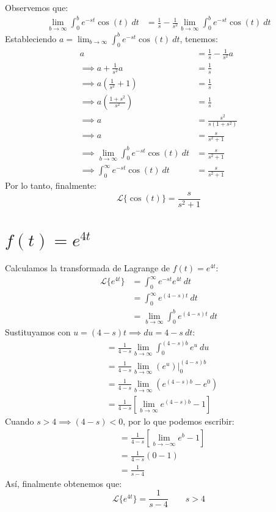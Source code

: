 \documentclass[12pt, a4paper]{article}
\begin{document}
Observemos que:
\begin{align*}
	\lim_{b \to \infty} \int_{0}^{b} e^{-st} \cos (t) \ dt &= \frac{1}{s} - \frac{1}{s^{2}}\lim_{b \to \infty} \int_{0}^{b} e^{-st} \cos (t) \ dt
\end{align*}
Estableciendo \(a = \lim_{b \to \infty} \int_{0}^{b} e^{-st} \cos (t) \ dt\), tenemos:
\begin{align*}
	a &= \frac{1}{s} - \frac{1}{s ^{2}} a \\
	\implies a + \frac{1}{s ^{2}} a &= \frac{1}{s} \\
	\implies a \left(\frac{1}{s ^{2}} + 1 \right) &= \frac{1}{s} \\
	\implies a \left( \frac{1+s ^{2}}{s ^{2}} \right) &= \frac{1}{s} \\
	\implies a &= \frac{s ^{2}}{s(1+s ^{2})} \\
	\implies a &= \frac{s}{s ^{2} + 1} \\
	\implies \lim_{b \to \infty} \int_{0}^{b} e^{-st} \cos (t) \ dt &= \frac{s}{s ^{2} + 1} \\
	\implies \int_{0}^{\infty} e^{-st} \cos (t) \ dt &= \frac{s}{s ^{2} + 1}
\end{align*}
Por lo tanto, finalmente:
\[
	\mathcal{L}\{\cos (t)\} = \frac{s}{s ^{2} + 1}
\]


\setcounter{section}{10}
\section{\texorpdfstring{\(f(t)=e^{4t}\)}{f (t) = e (4t) }}

Calculamos la transformada de Lagrange de \(f(t) = e^{4t}\):
\begin{align*}
	\mathcal{L}\{e^{4t}\} &= \int_{0}^{\infty} e^{-st} e^{4t}\ dt \\
	&= \int_{0}^{\infty} e^{(4-s)t} \ dt \\
	&= \lim_{b \to \infty} \int_{0}^{b} e^{(4-s)t} \ dt
\end{align*}
Sustituyamos con \(u = (4-s) t \implies du = 4-s\ dt\):
\begin{align*}
	&= \frac{1}{4-s} \lim_{b \to \infty} \int_{0}^{(4-s)b} e^{u} \ du \\
	&= \frac{1}{4-s} \lim_{b \to \infty} \left. \left( e^{u} \right)  \right|_{0}^{(4-s)b} \\
	&= \frac{1}{4-s} \lim_{b \to \infty} \left( e^{(4-s)b} - e^{0} \right) \\
	&= \frac{1}{4-s} \left[ \lim_{b \to \infty} e^{(4-s)b} - 1 \right]
\end{align*}
Cuando \(s > 4 \implies (4-s) < 0\), por lo que podemos escribir:
\begin{align*}
	&= \frac{1}{4-s} \left[ \lim_{b \to -\infty} e^{b} - 1 \right] \\
	&= \frac{1}{4-s} (0 - 1) \\
	&= \frac{1}{s-4}
\end{align*}
Así, finalmente obtenemos que:
\[
	\mathcal{L}\{e^{4t}\} = \frac{1}{s-4} \qquad s > 4
\]
\end{document}
